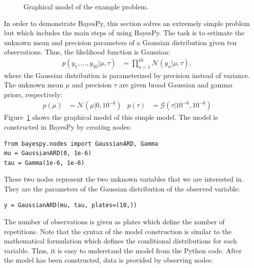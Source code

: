 \documentclass[twoside,11pt]{article}
\begin{document}
\begin{figure}
  \centering
  \caption{Graphical model of the example problem.}
  \label{fig:graphical_model}
\end{figure}
In order to demonstrate BayesPy, this section solves an extremely simple problem
but which includes the main steps of using BayesPy.  The task is to estimate the
unknown mean and precision parameters of a Gaussian distribution given ten
observations.  Thus, the likelihood function is Gaussian:
\begin{align}
  p(y_1,\ldots,y_{10}|\mu,\tau) &= \prod^{10}_{n=1}\mathcal{N}(y_n | \mu, \tau),
\end{align}
where the Gaussian distribution is parameterized by precision instead of
variance.  The unknown mean $\mu$ and precision $\tau$ are given broad Gaussian
and gamma priors, respectively:
\begin{align}
  p(\mu) &= \mathcal{N}(\mu|0, 10^{-6}) & p(\tau) &= \mathcal{G}(\tau|10^{-6},
  10^{-6})
\end{align}
Figure~\ref{fig:graphical_model} shows the graphical model of this simple model.
The model is constructed in BayesPy by creating nodes:
\begin{lstlisting}
from bayespy.nodes import GaussianARD, Gamma
mu = GaussianARD(0, 1e-6)
tau = Gamma(1e-6, 1e-6)
\end{lstlisting}
These two nodes represent the two unknown variables that we are interested in.
They are the parameters of the Gaussian distribution of the observed variable:
\begin{lstlisting}
y = GaussianARD(mu, tau, plates=(10,))
\end{lstlisting}
The number of observations is given as plates which define the number of
repetitions.  Note that the syntax of the model construction is similar to the
mathematical formulation which defines the conditional distributions for each
variable.  Thus, it is easy to understand the model from the Python code.  After
the model has been constructed, data is provided by observing nodes:
\end{document}
